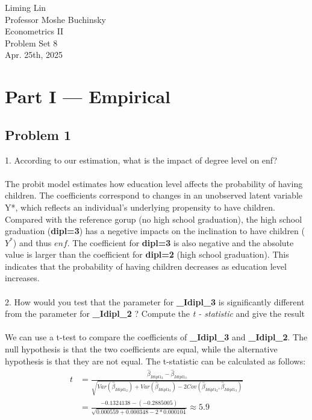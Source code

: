 \documentclass[12pt]{article}
\begin{document}
\begin{flushleft}
Liming Lin\\
Professor Moshe Buchinsky\\
Econometrics II\\
Problem Set 8\\
Apr. 25th, 2025\\
\section*{Part I --- Empirical}
\subsection*{Problem 1}
1. According to our estimation, what is the impact of degree level on enf? \\~\\
The probit model estimates how education level affects the probability of having children. The coefficients correspond to changes in an unobserved latent variable Y*, which reflects an individual's underlying propensity to have children. Compared with the reference gorup (no high school graduation), the high school graduation (\textbf{dipl=3}) has a negetive impacts on the inclination to have children ($Y^*$) and thus $enf$. The coefficient for \textbf{dipl=3} is also negative and the absolute value is larger than the coefficient for \textbf{dipl=2} (high school graduation). This indicates that the probability of having children decreases as education level increases.\\~\\
2. How would you test that the parameter for \textbf{\_Idipl\_3} is significantly different from the parameter for \textbf{\_Idipl\_2} ? Compute the \textit{t - statistic} and give the result\\~\\
We can use a t-test to compare the coefficients of \textbf{\_Idipl\_3} and \textbf{\_Idipl\_2}. The null hypothesis is that the two coefficients are equal, while the alternative hypothesis is that they are not equal. The t-statistic can be calculated as follows:
\begin{align*}
t &= \frac{\hat{\beta}_{Idipl1_2} - \hat{\beta}_{Idipl1_3}}{\sqrt{Var(\hat{\beta}_{Idipl1_2}) + Var(\hat{\beta}_{Idipl1_3})-2Cov(\hat{\beta}_{Idipl1_2}, \hat{\beta}_{Idipl1_3})}}\\
&=\frac{-0.1324138-(-0.2885005)}{\sqrt{0.000559+0.000348-2*0.000104}} \approx 5.9
\end{align*}

\end{flushleft}
\end{document}
